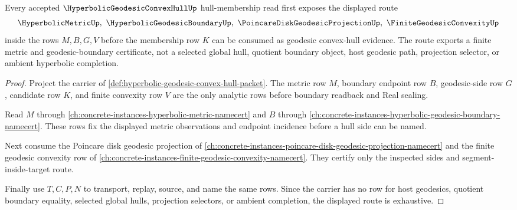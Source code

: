 \begin{theorem}
\label{thm:hyperbolic-geodesic-convex-hull-route}
Every accepted $\HyperbolicGeodesicConvexHullUp$ hull-membership read first exposes the displayed route
$$
\HyperbolicMetricUp,\ \HyperbolicGeodesicBoundaryUp,\ \PoincareDiskGeodesicProjectionUp,\ \FiniteGeodesicConvexityUp
$$
inside the rows $M,B,G,V$ before the membership row $K$ can be consumed as geodesic convex-hull evidence. The route exports a finite metric and geodesic-boundary certificate, not a selected global hull, quotient boundary object, host geodesic path, projection selector, or ambient hyperbolic completion.
\end{theorem}
\begin{proof}
Project the carrier of \autoref{def:hyperbolic-geodesic-convex-hull-packet}. The metric row $M$, boundary endpoint row $B$, geodesic-side row $G$, candidate row $K$, and finite convexity row $V$ are the only analytic rows before boundary readback and Real sealing.

Read $M$ through \autoref{ch:concrete-instances-hyperbolic-metric-namecert} and $B$ through \autoref{ch:concrete-instances-hyperbolic-geodesic-boundary-namecert}. These rows fix the displayed metric observations and endpoint incidence before a hull side can be named.

Next consume the Poincare disk geodesic projection of \autoref{ch:concrete-instances-poincare-disk-geodesic-projection-namecert} and the finite geodesic convexity row of \autoref{ch:concrete-instances-finite-geodesic-convexity-namecert}. They certify only the inspected sides and segment-inside-target route.

Finally use $T,C,P,N$ to transport, replay, source, and name the same rows. Since the carrier has no row for host geodesics, quotient boundary equality, selected global hulls, projection selectors, or ambient completion, the displayed route is exhaustive.
\end{proof}

